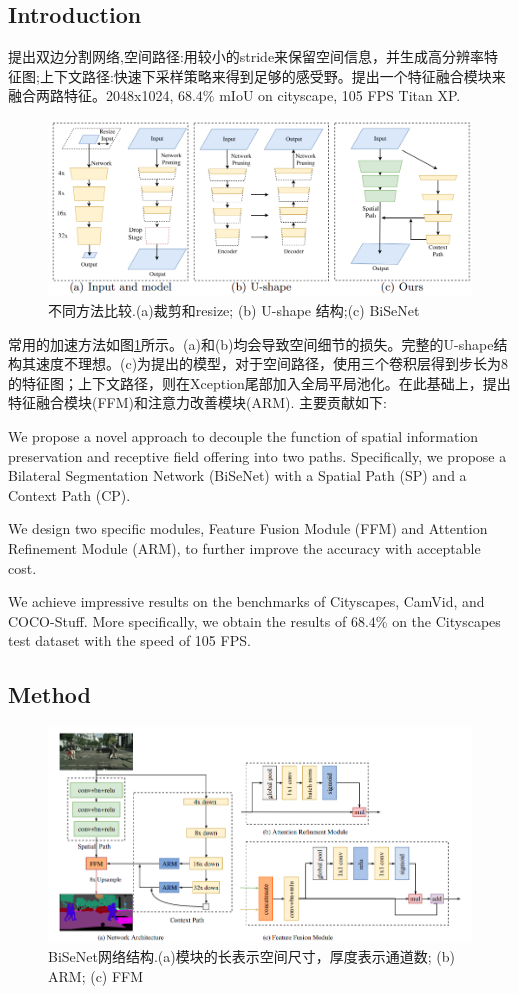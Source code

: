 \documentclass{article}
\begin{document}
\subsection{Introduction}
提出双边分割网络,空间路径:用较小的stride来保留空间信息，并生成高分辨率特征图;上下文路径:快速下采样策略来得到足够的感受野。提出一个特征融合模块来融合两路特征。2048x1024,  $68.4\%$ mIoU on cityscape, 105 FPS Titan XP. 
\begin{figure}[htp]
\centering
\includegraphics[scale=0.4]{image/bisenet.png}
\caption{不同方法比较.(a)裁剪和resize; (b) U-shape 结构;(c) BiSeNet}
\label{Fig.bisenet}
\end{figure}
常用的加速方法如图\ref{Fig.bisenet}所示。(a)和(b)均会导致空间细节的损失。完整的U-shape结构其速度不理想。(c)为提出的模型，对于空间路径，使用三个卷积层得到步长为8的特征图；上下文路径，则在Xception尾部加入全局平局池化。在此基础上，提出特征融合模块(FFM)和注意力改善模块(ARM). 主要贡献如下:

We propose a novel approach to decouple the function of spatial information preservation and receptive field offering into two paths. Specifically, we propose a Bilateral Segmentation Network (BiSeNet) with a Spatial Path (SP) and a Context Path (CP).

We design two specific modules, Feature Fusion Module (FFM) and Attention Refinement Module (ARM), to further improve the accuracy with acceptable cost.

We achieve impressive results on the benchmarks of Cityscapes, CamVid, and COCO-Stuff. More specifically, we obtain the results of $68.4\%$ on the Cityscapes test dataset with the speed of 105 FPS.

\subsection{Method}
\begin{figure}[htp]
\centering
\includegraphics[scale=0.5]{image/bisenet_arch.png}
\caption{BiSeNet网络结构.(a)模块的长表示空间尺寸，厚度表示通道数; (b) ARM; (c) FFM}
\label{Fig.bisenet_arch}
\end{figure}
\end{document}
